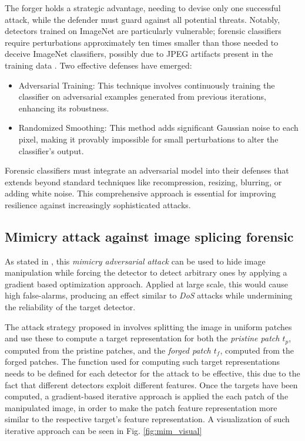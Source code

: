 \documentclass[conference]{IEEEtran} %
\begin{document}
        The forger holds a strategic advantage, needing to devise only one successful attack, while the defender must guard against all potential threats. Notably, detectors trained on ImageNet \cite{denglarge} are particularly vulnerable; forensic classifiers require perturbations approximately ten times smaller than those needed to deceive ImageNet classifiers, possibly due to JPEG artifacts present in the training data \cite{mardeenpaper1}.
        Two effective defenses have emerged:
        \begin{itemize}
            \item Adversarial Training: This technique involves continuously training the classifier on adversarial examples generated from previous iterations, enhancing its robustness.
            \item Randomized Smoothing: This method adds significant Gaussian noise to each pixel, making it provably impossible for small perturbations to alter the classifier's output.
        \end{itemize}
        
        Forensic classifiers must integrate an adversarial model into their defenses that extends beyond standard techniques like recompression, resizing, blurring, or adding white noise. This comprehensive approach is essential for improving resilience against increasingly sophisticated attacks.

    \subsection{Mimicry attack against image splicing forensic}
        As stated in \cite{boato2024adversarial}, this \textit{mimicry adversarial attack} can be used to hide image manipulation while forcing the detector to detect arbitrary ones by applying a gradient based optimization approach. Applied at large scale, this would cause high false-alarms, producing an effect similar to \textit{DoS} attacks while undermining the reliability of the target detector.

        The attack strategy proposed in \cite{boato2024adversarial} involves splitting the image in uniform patches and use these to compute a target representation for both the \textit{pristine patch $t_p$}, computed from the pristine patches, and the \textit{forged patch $t_f$}, computed from the forged patches. The function used for computing such target representations needs to be defined for each detector for the attack to be effective, this due to the fact that different detectors exploit different features. Once the targets have been computed, a gradient-based iterative approach is applied the each patch of the manipulated image, in order to make the patch feature representation more similar to the respective target's feature representation. A visualization of such iterative approach can be seen in Fig. \ref{fig:mim_visual}
\end{document}
